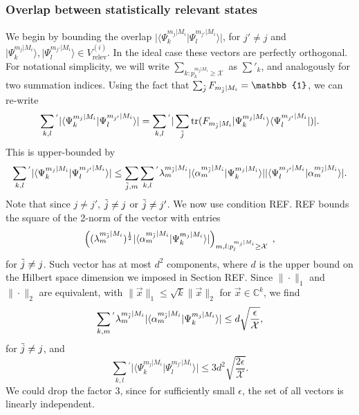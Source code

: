 \subsubsection{Overlap between statistically relevant states}
We begin by bounding the overlap $\vert \langle \Psi_k^{m_j\vert M_i}\vert \Psi_l^{m_{j'}\vert M_i}\rangle \vert$, for $j'\neq j$ and $\vert \Psi_k^{m_j\vert M_i}\rangle, \vert \Psi_l^{m_{j'}\vert M_i}\rangle \in V_{\text{relev}}^{(i)}$. In the ideal case these vectors are perfectly orthogonal. For notational simplicity, we will write $\sum_{k:p_k^{m_j\vert M_i}\geq \mathcal{X}}$ as $\sum'_k$, and analogously for two summation indices.
Using the fact that $\sum_{\Tilde{j}}F_{m_{\Tilde{j}}\vert M_i}=\mathbb{1}$, we can re-write
\begin{equation}
\sum_{k,l}{}^{'}\vert\langle \Psi_k^{m_j\vert M_i} \vert \Psi_l^{m_{j'}\vert M_i}\rangle \vert = \sum_{k,l}{}^{'}\vert \sum_{\Tilde{j}} \operatorname{tr}(F_{m_{\Tilde{j}}\vert M_i}\vert \Psi_k^{m_j\vert M_i}\rangle\langle \Psi_l^{m_{j'}\vert M_i}\vert) \vert.
\end{equation}
This is upper-bounded by
\begin{equation}
\sum_{k,l}{}^{'}\vert\langle \Psi_k^{m_j\vert M_i} \vert \Psi_l^{m_{j'}\vert M_i}\rangle \vert \leq \sum_{\Tilde{j},m}\sum_{k,l}{}^{'}\lambda_m^{m_{\Tilde{j}}\vert M_i}\vert \langle \alpha_m^{m_{\Tilde{j}}\vert M_i} \vert \Psi_k^{m_j\vert M_i} \rangle \vert \vert \langle \Psi_l^{m_{j'}\vert M_i}\vert \alpha_m^{m_{\Tilde{j}}\vert M_i} \rangle \vert.
\end{equation}
Note that since $j\neq j'$, $\Tilde{j}\neq j$ or $\Tilde{j}\neq j'$. We now use condition REF. REF bounds the square of the 2-norm of the vector with entries
\begin{equation*}
\left((\lambda_m^{m_{\Tilde{j}}\vert M_i})^{\frac{1}{2}}\vert \langle \alpha_m^{m_{\Tilde{j}}\vert M_i}\vert \Psi_k^{m_j\vert M_i}\rangle \vert\right)_{m,l:p_l^{m_j\vert M_i}\geq \mathcal{X}}\;,
\end{equation*} 
for $\Tilde{j}\neq j$. Such vector has at most $d^2$ components, where $d$ is the upper bound on the Hilbert space dimension we imposed in Section REF. Since $\|\cdot\|_1$ and $\|\cdot\|_2$ are equivalent, with $\|\vec{x}\|_1\leq \sqrt{k}\|\vec{x}\|_2$ for $\vec{x}\in\mathbb{C}^k$, we find
\begin{equation}
\sum_{k,m}{}^{'}\lambda_m^{m_{\Tilde{j}}\vert M_i}\vert \langle \alpha_m^{m_{\Tilde{j}}\vert M_i}\vert \Psi_k^{m_j\vert M_i}\rangle \vert \leq d\sqrt{\frac{\epsilon}{\mathcal{X}}},
\end{equation}
for $\Tilde{j}\neq j$, and
\begin{equation}
\sum_{k,l}{}^{'}\vert\langle \Psi_k^{m_j\vert M_i} \vert \Psi_l^{m_{j'}\vert M_i}\rangle \vert \leq 3 d^2\sqrt{\frac{2\epsilon}{\mathcal{X}}}.
\end{equation}
We could drop the factor $3$, since for sufficiently small $\epsilon$, the set of all vectors is linearly independent.
